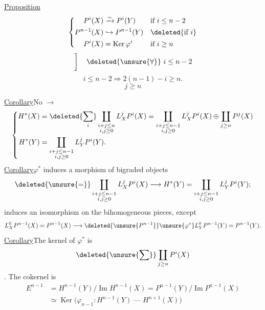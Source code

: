 \uline{Proposition}
\[
\left\{\begin{aligned}
P^i(X)&\xrightarrow{\sim}P^i(Y) &&\text{if }i\leq n-2\\
P^{n-1}(X)&\hookrightarrow P^{n-1}(Y) &&\deleted{\text{if }i}\\
P^i(X)&=\operatorname{Ker}\varphi^i &&\text{if }i\geq n
\end{aligned}\right.
\]
\[\left.\vphantom{\begin{matrix}H^i(X)\\H^i(Y)\end{matrix}}\right]\quad\deleted{\unsure{\forall}}\ i\leq n-2\]
\[i\leq n-2\Rightarrow 2(n-1)-i\geq n.\]
\[j\geq n\]

\uline{Corollary}\qquad No $\longrightarrow$
\[
\left\{\begin{aligned}
H^*(X)&=\deleted{\sum_i}\coprod_{\substack{i+j\leq n\\i,j\geq0}}L_X^jP^i(X)
=\coprod_{\substack{i+j\leq n-1\\i,j\geq0}}L_X^jP^i(X)\oplus\coprod_{j\geq n}P^j(X)\\
H^*(Y)&=\coprod_{\substack{i+j\leq n-1\\i,j\geq0}}L_Y^jP^i(Y).
\end{aligned}\right.
\]
\uline{Corollary}\qquad $\varphi^*$ induces a morphism of bigraded objects
\[
\deleted{\unsure{=}}\coprod_{\substack{i+j\leq n-1\\i,j\geq0}}L_X^jP^i(X)
\longrightarrow H^*(Y)=\coprod_{\substack{i+j\leq n-1\\i,j\geq0}}L_Y^jP^i(Y);\]
 induces an isomorphism on the bihomogeneous pieces, except
\[
L_X^0P^{n-1}(X)=P^{n-1}(X)\longrightarrow\deleted{\unsure{P^{n-1}}}\unsure{\varphi^*}L_Y^0P^{n-1}(Y)=P^{n-1}(Y).
\]
\uline{Corollary}\qquad The kernel of $\varphi^*$ is 
\[\deleted{\unsure{\sum}}\coprod_{j\geq n}P^i(X)\]
. The cokernel is
\[
\begin{aligned}
E^{n-1}&=H^{n-1}(Y)/\operatorname{Im}H^{n-1}(X)=P^{n-1}(Y)/\operatorname{Im}P^{n-1}(X)\\
&\simeq\operatorname{Ker}\bigl(\varphi_{n-1}:H^{n-1}(Y)\mathrel{\text{---}}H^{n+1}(X)\bigr)
\end{aligned}
\]

